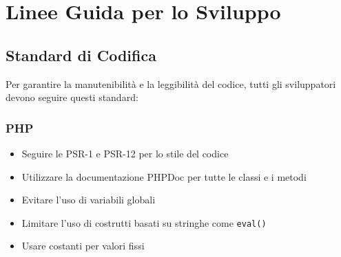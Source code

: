 %

\section{Linee Guida per lo Sviluppo}

\subsection{Standard di Codifica}
Per garantire la manutenibilità e la leggibilità del codice, tutti gli sviluppatori devono seguire questi standard:

\subsubsection{PHP}
\begin{itemize}
    \item Seguire le PSR-1 e PSR-12 per lo stile del codice
    \item Utilizzare la documentazione PHPDoc per tutte le classi e i metodi
    \item Evitare l'uso di variabili globali
    \item Limitare l'uso di costrutti basati su stringhe come \texttt{eval()}
    \item Usare costanti per valori fissi
\end{itemize}

